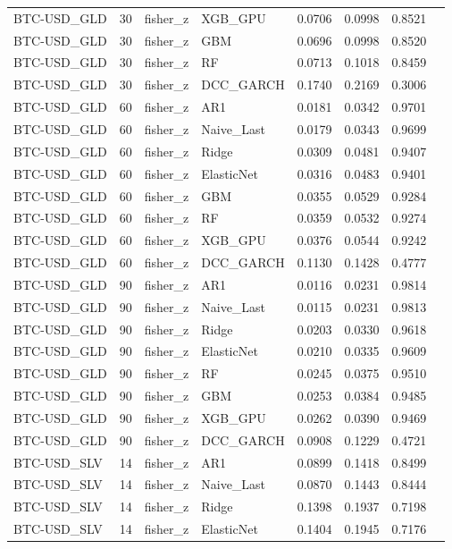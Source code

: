\begin{table}[H]
\begin{tabular}{llllrrrr}
BTC-USD_GLD & 30 & fisher_z & XGB_GPU & 0.0706 & 0.0998 & 0.8521 &  \\
BTC-USD_GLD & 30 & fisher_z & GBM & 0.0696 & 0.0998 & 0.8520 &  \\
BTC-USD_GLD & 30 & fisher_z & RF & 0.0713 & 0.1018 & 0.8459 &  \\
BTC-USD_GLD & 30 & fisher_z & DCC_GARCH & 0.1740 & 0.2169 & 0.3006 &  \\
BTC-USD_GLD & 60 & fisher_z & AR1 & 0.0181 & 0.0342 & 0.9701 &  \\
BTC-USD_GLD & 60 & fisher_z & Naive_Last & 0.0179 & 0.0343 & 0.9699 &  \\
BTC-USD_GLD & 60 & fisher_z & Ridge & 0.0309 & 0.0481 & 0.9407 &  \\
BTC-USD_GLD & 60 & fisher_z & ElasticNet & 0.0316 & 0.0483 & 0.9401 &  \\
BTC-USD_GLD & 60 & fisher_z & GBM & 0.0355 & 0.0529 & 0.9284 &  \\
BTC-USD_GLD & 60 & fisher_z & RF & 0.0359 & 0.0532 & 0.9274 &  \\
BTC-USD_GLD & 60 & fisher_z & XGB_GPU & 0.0376 & 0.0544 & 0.9242 &  \\
BTC-USD_GLD & 60 & fisher_z & DCC_GARCH & 0.1130 & 0.1428 & 0.4777 &  \\
BTC-USD_GLD & 90 & fisher_z & AR1 & 0.0116 & 0.0231 & 0.9814 &  \\
BTC-USD_GLD & 90 & fisher_z & Naive_Last & 0.0115 & 0.0231 & 0.9813 &  \\
BTC-USD_GLD & 90 & fisher_z & Ridge & 0.0203 & 0.0330 & 0.9618 &  \\
BTC-USD_GLD & 90 & fisher_z & ElasticNet & 0.0210 & 0.0335 & 0.9609 &  \\
BTC-USD_GLD & 90 & fisher_z & RF & 0.0245 & 0.0375 & 0.9510 &  \\
BTC-USD_GLD & 90 & fisher_z & GBM & 0.0253 & 0.0384 & 0.9485 &  \\
BTC-USD_GLD & 90 & fisher_z & XGB_GPU & 0.0262 & 0.0390 & 0.9469 &  \\
BTC-USD_GLD & 90 & fisher_z & DCC_GARCH & 0.0908 & 0.1229 & 0.4721 &  \\
BTC-USD_SLV & 14 & fisher_z & AR1 & 0.0899 & 0.1418 & 0.8499 &  \\
BTC-USD_SLV & 14 & fisher_z & Naive_Last & 0.0870 & 0.1443 & 0.8444 &  \\
BTC-USD_SLV & 14 & fisher_z & Ridge & 0.1398 & 0.1937 & 0.7198 &  \\
BTC-USD_SLV & 14 & fisher_z & ElasticNet & 0.1404 & 0.1945 & 0.7176 &  \\

\end{tabular}
\end{table}
